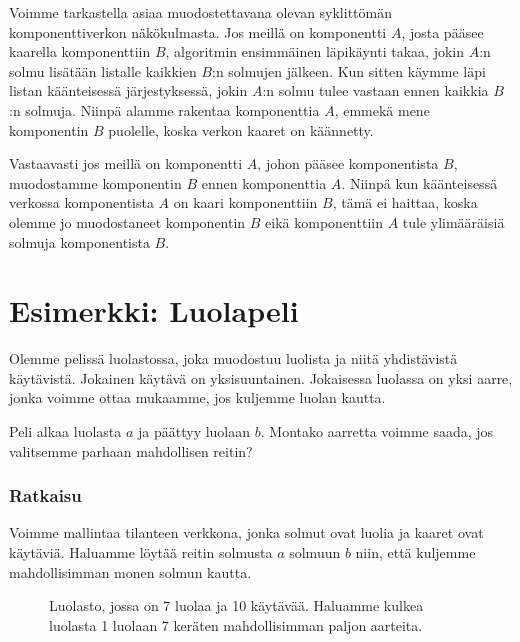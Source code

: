 Voimme tarkastella asiaa muodostettavana olevan syklittömän
komponenttiverkon näkökulmasta.
Jos meillä on komponentti $A$, josta pääsee kaarella
komponenttiin $B$, 
algoritmin ensimmäinen läpikäynti takaa,
jokin $A$:n solmu lisätään listalle kaikkien $B$:n
solmujen jälkeen.
Kun sitten käymme läpi listan käänteisessä järjestyksessä,
jokin $A$:n solmu tulee vastaan ennen kaikkia $B$:n
solmuja.
Niinpä alamme rakentaa komponenttia $A$,
emmekä mene komponentin $B$ puolelle,
koska verkon kaaret on käännetty.

Vastaavasti jos meillä on komponentti $A$,
johon pääsee komponentista $B$,
muodostamme komponentin $B$ ennen komponenttia $A$.
Niinpä kun käänteisessä verkossa
komponentista $A$ on kaari komponenttiin $B$,
tämä ei haittaa, koska olemme jo muodostaneet
komponentin $B$ eikä komponenttiin $A$ tule ylimääräisiä solmuja
komponentista $B$.

\section{Esimerkki: Luolapeli}

Olemme pelissä luolastossa, joka muodostuu luolista ja niitä yhdistävistä
käytävistä. Jokainen käytävä on yksisuuntainen.
Jokaisessa luolassa on yksi aarre, jonka voimme ottaa mukaamme,
jos kuljemme luolan kautta.

Peli alkaa luolasta $a$ ja päättyy luolaan $b$.
Montako aarretta voimme saada, jos valitsemme parhaan
mahdollisen reitin?

\subsubsection{Ratkaisu}

Voimme mallintaa tilanteen verkkona, jonka solmut ovat luolia ja
kaaret ovat käytäviä. Haluamme löytää reitin solmusta $a$ solmuun $b$
niin, että kuljemme mahdollisimman monen solmun kautta.

\begin{figure}
\center
\begin{center}
\end{center}
\caption{Luolasto, jossa on 7 luolaa ja 10 käytävää.
Haluamme kulkea luolasta 1 luolaan 7 keräten mahdollisimman paljon aarteita.}
\label{fig:luopel}
\end{figure}

